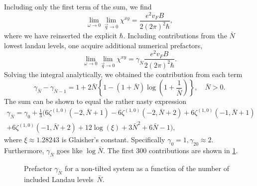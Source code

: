 Including only the first term of the sum, we find
\begin{equation}
  \label{eq:94}
  \lim_{\omega \to 0} \lim_{\vec{q} \to 0} \chi^{xy} = \frac{e^2 v_F B}{2 (2 \pi)^2 \hbar},
\end{equation}
where we have reinserted the explicit \( \hbar \).
Including contributions from the \( \bar{N} \) lowest landau levels, one acquire additional numerical prefactors,
\begin{equation}
  \label{eq:95}
  \lim_{\omega \to 0} \lim_{\vec{q} \to 0} \chi^{xy} = \gamma_{\bar{N}} \frac{e^2 v_F B}{2 (2 \pi)^2 \hbar}.
\end{equation}
Solving the integral analytically, we obtained the contribution from each term
\begin{equation}
  \gamma_{\bar{N}} - \gamma_{\bar{N}-1} = 1 + 2 \bar{N} \left\{1 - (1+\bar{N}) \log(1 + \frac{1}{\bar{N}}) \right\} , \quad \bar{N} > 0.
\end{equation}
The sum can be shown to equal the rather nasty expression
\begin{multline}
  \gamma_{\bar{N}} = \gamma_0 + \frac{1}{3} \Big(
    6 \zeta ^{(1,0)}(-2,\bar{N}+1)
    -6 \zeta ^{(1,0)}(-2,\bar{N}+2)
    +6 \zeta^{(1,0)}(-1,\bar{N}+1)\\
    + 6 \zeta^{(1,0)}(-1,\bar{N}+2)
    +12 \log (\xi)
    +3 \bar{N}^2
    +6 \bar{N}
    -1
  \Big),
\end{multline}
where \( \xi \approx  1.28243 \) is Glaisher's constant.
Specifically \( \gamma_0 = 1, \gamma_{20} \approx 2 \).
Furthermore, \( \gamma_{\bar{N}} \) goes like \( \log \bar{N} \).
The first 300 contributions are shown in \cref{fig:contributions}.

\begin{figure}[ht]
  \centering
  \newcommand\datafiles{notilt_contrib.csv/}
  \newcommand\plottitle{Numerical prefactor \( \gamma_N \) for untilted system}  %
  \newcommand\prefix{\gamma_N}
  
  \caption{Prefactor \( \gamma_{\bar{N}} \) for a non-tilted system as a function of the number of included Landau levels~\( \bar{N} \).}
  \label{fig:contributions}
\end{figure}


